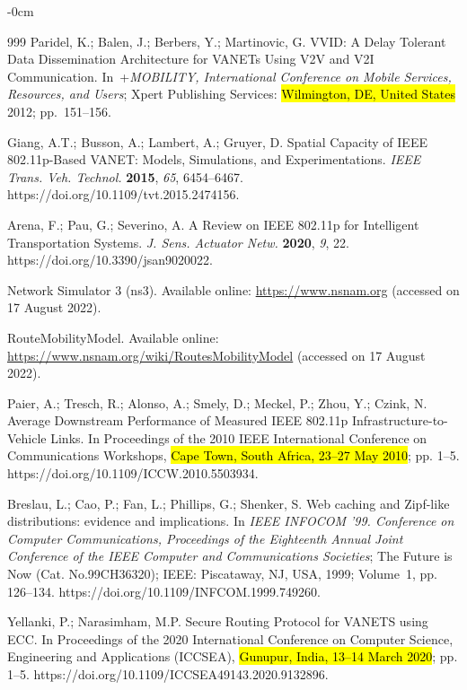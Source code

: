 \documentclass[electronics,aricle,accept,pdftex,moreauthors]{Definitions/mdpi}
\begin{document}
\begin{adjustwidth}{-\extralength}{0cm}
\begin{thebibliography}{999}
Paridel, K.; Balen, J.; Berbers, Y.; Martinovic, G. VVID: A Delay Tolerant Data Dissemination Architecture for VANETs Using V2V and V2I Communication. In~+\textit{MOBILITY, International Conference on Mobile Services, Resources, and Users}; Xpert Publishing Services: \hl{Wilmington, DE, United States} %
2012; pp.~151--156.%

Giang, A.T.; Busson, A.; Lambert, A.; Gruyer, D. Spatial Capacity of IEEE 802.11p-Based VANET: Models, Simulations, and Experimentations. \emph{IEEE Trans. Veh. Technol.} \textbf{2015}, \emph{65}, 6454–6467. https://doi.org/10.1109/tvt.2015.2474156.

Arena, F.; Pau, G.; Severino, A. A Review on IEEE 802.11p for Intelligent Transportation Systems. \emph{J. Sens. Actuator Netw.} \textbf{2020}, \emph{9}, 22. https://doi.org/10.3390/jsan9020022.

Network Simulator 3 (ns3). Available online: \url{https://www.nsnam.org} (accessed on 17 August 2022).

RouteMobilityModel. Available online: \url{https://www.nsnam.org/wiki/RoutesMobilityModel} (accessed on 17 August 2022).

Paier, A.; Tresch, R.; Alonso, A.; Smely, D.; Meckel, P.; Zhou, Y.; Czink, N. Average Downstream Performance of Measured IEEE 802.11p Infrastructure-to-Vehicle Links. In Proceedings of the 2010 IEEE International Conference on Communications Workshops, \hl{Cape Town, South Africa, 23--27 May 2010}; pp. 1--5. https://doi.org/10.1109/ICCW.2010.5503934.

Breslau, L.; Cao, P.; Fan, L.; Phillips, G.; Shenker, S. Web caching and Zipf-like distributions: evidence and implications. In
\emph{IEEE INFOCOM '99. Conference on Computer Communications, Proceedings of the Eighteenth Annual Joint Conference of the IEEE Computer and Communications Societies}; The Future is Now (Cat. No.99CH36320); IEEE: Piscataway, NJ, USA, 1999; Volume~1, pp. 126--134. https://doi.org/10.1109/INFCOM.1999.749260.

Yellanki, P.; Narasimham, M.P. Secure Routing Protocol for VANETS using ECC. In Proceedings of the 2020 International Conference on Computer Science, Engineering and Applications (ICCSEA), \hl{Gunupur, India, 13--14 March 2020}; pp. 1--5. https://doi.org/10.1109/ICCSEA49143.2020.9132896.


\end{thebibliography}
\end{adjustwidth}
\end{document}
